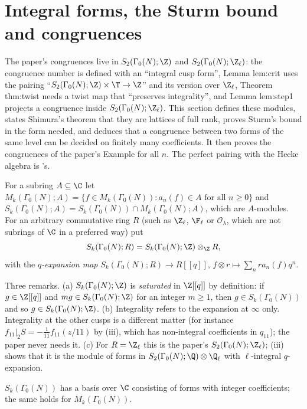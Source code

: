 \section{Integral forms, the Sturm bound and congruences}\label{sec:modforms:integral}

The paper's congruences live in $S_2(\Gamma_0(N);\Z)$ and $S_2(\Gamma_0(N);\Z_\ell)$: the congruence number is defined with an ``integral cusp form'', Lemma lem:crit uses the pairing
``$S_2(\Gamma_0(N);\Z)\times\T\to\Z$'' and its version over $\Z_\ell$, Theorem thm:twist needs a twist map that ``preserves integrality'', and Lemma lem:step1
projects a congruence inside $S_2(\Gamma_0(N);\Z_\ell)$. This section defines these modules, states Shimura's theorem that they are lattices of full rank, proves Sturm's bound in
the form needed, and deduces that a congruence between two forms of the same level can be decided on finitely many coefficients. It then proves the congruences of the
paper's Example for all $n$. The perfect pairing with the Hecke algebra is 's.

\begin{definition}\label{def:modforms:integral-forms}
For a subring $A\subseteq\C$ let $M_k(\Gamma_0(N);A)=\{f\in M_k(\Gamma_0(N)):a_n(f)\in A\text{ for all }n\ge0\}$ and $S_k(\Gamma_0(N);A)=S_k(\Gamma_0(N))\cap M_k(\Gamma_0(N);A)$, which are
$A$-modules. For an arbitrary commutative ring $R$ (such as $\Z_\ell$, $\F_\ell$ or $\mathcal O_\lambda$, which are not subrings of $\C$ in a preferred way) put
\[
S_k(\Gamma_0(N);R)=S_k(\Gamma_0(N);\Z)\otimes_\Z R,
\]
with the \emph{$q$-expansion map} $S_k(\Gamma_0(N);R)\to R[[q]]$, $f\otimes r\mapsto\sum_nra_n(f)q^n$.
\end{definition}

Three remarks. (a) $S_k(\Gamma_0(N);\Z)$ is \emph{saturated} in $\Z[[q]]$ by definition: if $g\in\Z[[q]]$ and $mg\in S_k(\Gamma_0(N);\Z)$ for an integer $m\ge1$, then $g\in S_k(\Gamma_0(N))$ and so
$g\in S_k(\Gamma_0(N);\Z)$. (b) Integrality refers to the expansion at $\infty$ only. Integrality at the other cusps is a different matter (for instance $f_{11}|_2S=-\frac1{11}f_{11}(z/11)$ by
(iii), which has non-integral coefficients in $q_{11}$); the paper never needs it. (c) For $R=\Z_\ell$ this is the paper's $S_2(\Gamma_0(N);\Z_\ell)$;
(iii) shows that it is the module of forms in $S_2(\Gamma_0(N);\Q)\otimes\Q_\ell$ with $\ell$-integral $q$-expansion.

\begin{theorem}\label{thm:modforms:integral-basis}
$S_k(\Gamma_0(N))$ has a basis over $\C$ consisting of forms with integer coefficients; the same holds for $M_k(\Gamma_0(N))$.
\end{theorem}

